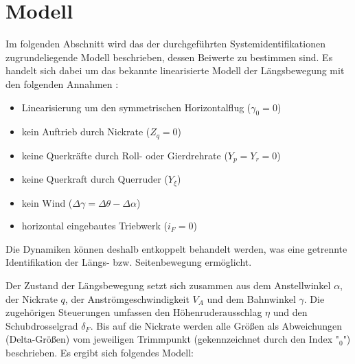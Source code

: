 \chapter{Modell} \label{chapter:Modell}
Im folgenden Abschnitt wird das der durchgeführten Systemidentifikationen zugrundeliegende Modell beschrieben, dessen 
Beiwerte zu bestimmen sind. Es handelt sich dabei um das bekannte linearisierte Modell der Längsbewegung mit 
den folgenden Annahmen \cite{Fichter2009}:

\begin{itemize}
	\item Linearisierung um den symmetrischen Horizontalflug ($ \gamma_0=0 $)
	\item kein Auftrieb durch Nickrate ($ Z_q=0 $)
	\item keine Querkräfte durch Roll- oder Gierdrehrate ($ Y_p=Y_r=0 $)
	\item keine Querkraft durch Querruder ($ Y_\xi $)
	\item kein Wind ($ \Delta\gamma = \Delta\theta-\Delta\alpha $)
	\item horizontal eingebautes Triebwerk ($ i_F=0 $)
\end{itemize} 

Die Dynamiken können deshalb entkoppelt behandelt werden, was eine getrennte Identifikation der Längs- bzw. Seitenbewegung 
ermöglicht. %

Der Zustand der Längsbewegung setzt sich zusammen aus dem Anstellwinkel $ \alpha $, der Nickrate $ q $, der 
Anströmgeschwindigkeit $ V_A $ und dem Bahnwinkel $ \gamma $. Die zugehörigen Steuerungen umfassen den Höhenruderausschlag $ 
\eta $ und den Schubdrosselgrad $ \delta_F $. Bis auf die Nickrate werden alle Größen als Abweichungen (Delta-Größen) vom 
jeweiligen Trimmpunkt (gekennzeichnet durch den Index "$ _0 $") beschrieben. Es ergibt sich folgendes Modell:

